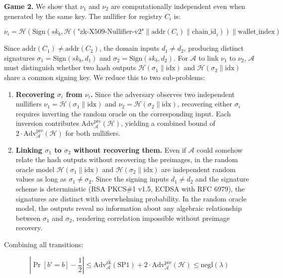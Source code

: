 \documentclass[11pt, a4paper]{article}
\begin{document}
\textbf{Game 2.} We show that \(\nu_1\) and \(\nu_2\) are
computationally independent even when generated by the same key. The
nullifier for registry \(C_i\) is:

\[\nu_i = \mathcal{H}(\text{Sign}(sk_b, \mathcal{H}(\text{"zk-X509-Nullifier-v2"} \| \text{addr}(C_i) \| \text{chain\_id}_i)) \| \text{wallet\_index})\]

Since \(\text{addr}(C_1) \neq \text{addr}(C_2)\), the domain inputs
\(d_1 \neq d_2\), producing distinct signatures
\(\sigma_1 = \text{Sign}(sk_b, d_1)\) and
\(\sigma_2 = \text{Sign}(sk_b, d_2)\). For \(\mathcal{A}\) to link
\(\nu_1\) to \(\nu_2\), \(\mathcal{A}\) must distinguish whether two
hash outputs \(\mathcal{H}(\sigma_1 \| \text{idx})\) and
\(\mathcal{H}(\sigma_2 \| \text{idx})\) share a common signing key. We
reduce this to two sub-problems:

\begin{enumerate}
\def\labelenumi{(\alph{enumi})}
\item
  \textbf{Recovering \(\sigma_i\) from \(\nu_i\).} Since the adversary
  observes two independent nullifiers
  \(\nu_1 = \mathcal{H}(\sigma_1 \| \text{idx})\) and
  \(\nu_2 = \mathcal{H}(\sigma_2 \| \text{idx})\), recovering either
  \(\sigma_i\) requires inverting the random oracle on the corresponding
  input. Each inversion contributes
  \(\text{Adv}_{\mathcal{A}}^{\text{pre}}(\mathcal{H})\), yielding a
  combined bound of
  \(2 \cdot \text{Adv}_{\mathcal{A}}^{\text{pre}}(\mathcal{H})\) for
  both nullifiers.
\item
  \textbf{Linking \(\sigma_1\) to \(\sigma_2\) without recovering them.}
  Even if \(\mathcal{A}\) could somehow relate the hash outputs without
  recovering the preimages, in the random oracle model
  \(\mathcal{H}(\sigma_1 \| \text{idx})\) and
  \(\mathcal{H}(\sigma_2 \| \text{idx})\) are independent random values
  as long as \(\sigma_1 \neq \sigma_2\). Since the signing inputs
  \(d_1 \neq d_2\) and the signature scheme is deterministic (RSA
  PKCS\#1 v1.5, ECDSA with RFC 6979), the signatures are distinct with
  overwhelming probability. In the random oracle model, the outputs
  reveal no information about any algebraic relationship between
  \(\sigma_1\) and \(\sigma_2\), rendering correlation impossible
  without preimage recovery.
\end{enumerate}

Combining all transitions:

\[\left| \Pr[b' = b] - \frac{1}{2} \right| \leq \text{Adv}_{\mathcal{A}}^{\text{zk}}(\text{SP1}) + 2 \cdot \text{Adv}_{\mathcal{A}}^{\text{pre}}(\mathcal{H}) \leq \text{negl}(\lambda)\]
\end{document}
